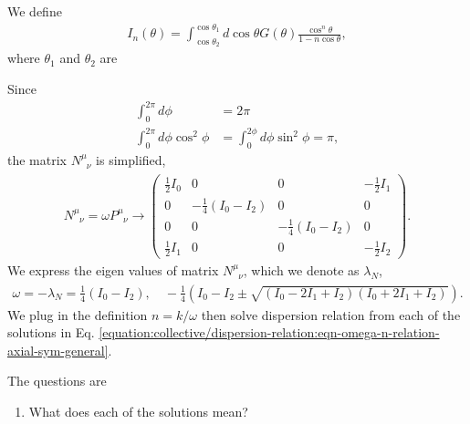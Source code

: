 \documentclass[letterpaper,12pt,english]{sphinxmanual}
\begin{document}
We define
\begin{equation*}
\begin{split}I_n(\theta)=\int_{\cos\theta_2}^{\cos\theta_1} d\cos\theta G(\theta) \frac{\cos^n\theta}{1 - n \cos\theta },\end{split}
\end{equation*}
where \(\theta_1\) and \(\theta_2\) are

Since
\begin{equation*}
\begin{split}\int_0^{2\pi} d\phi&=2\pi \\
\int_0^{2\pi} d\phi \cos^2\phi &=\int_0^{2\phi} d\phi \sin^2\phi = \pi,\end{split}
\end{equation*}
the matrix \(N^\mu_{\phantom{\mu}\nu}\) is simplified,
\begin{equation*}
\begin{split}N^\mu_{\phantom{\mu}\nu} = \omega P^\mu_{\phantom{\mu}\nu}\to  \begin{pmatrix}
\frac{1}{2}  I_0 & 0 & 0 & -\frac{1}{2}I_1\\
0 & -\frac{1}{4}(I_0-I_2) & 0 & 0\\
0 & 0 & -\frac{1}{4}(I_0-I_2) & 0 \\
\frac{1}{2}I_1 & 0 & 0 & -\frac{1}{2}I_2
\end{pmatrix}.\end{split}
\end{equation*}
We express the eigen values of matrix \(N^\mu_{\phantom{\mu}\nu}\), which we denote as \(\lambda_N\),
\label{\detokenize{collective/dispersion-relation:equation-eqn-omega-n-relation-axial-sym-general}}\begin{equation}\label{equation:collective/dispersion-relation:eqn-omega-n-relation-axial-sym-general}
\begin{split}\omega = -\lambda_N = \frac{1}{4}(I_0-I_2), \quad -\frac{1}{4}\left(I_0-I_2\pm \sqrt{ (I_0-2I_1+I_2)(I_0+2I_1+I_2) }\right).\end{split}
\end{equation}
We plug in the definition \(n=k/\omega\) then solve dispersion relation from each of the solutions in Eq. \eqref{equation:collective/dispersion-relation:eqn-omega-n-relation-axial-sym-general}.

The questions are
\begin{enumerate}
\item {} 
What does each of the solutions mean?

\end{enumerate}
\end{document}
